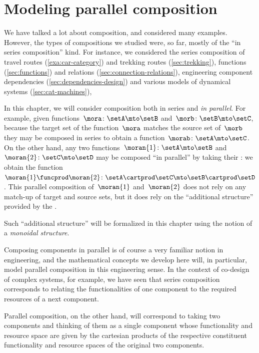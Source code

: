 
\section{Modeling parallel composition}
\label{sec:modeling-parallelism}

We have talked a lot about composition, and considered many examples.
However, the types of compositions we studied were, so far, mostly of the ``in series composition'' kind.
For instance, we considered the series composition of travel routes (\cref{exa:car-category}) and trekking routes (\cref{sec:trekking}), functions (\cref{sec:functions}) and relations (\cref{sec:connection-relations}), engineering component dependencies (\cref{sec:dependencies-design}) and various models of dynamical systems  (\cref{sec:cat-machines}), \etc

In this chapter, we will consider composition both in series and \emph{in parallel}.
For example, given functions~$\mora\colon \setA \mto \setB$ and~$\morb\colon \setB \mto \setC$, because the target set of the function~$\mora$ matches the source set of~$\morb$ they may be composed in series to obtain a function~$\morab\colon \setA \mto \setC$.
On the other hand, any two functions~$\moran{1} \colon \setA \mto \setB$ and~$\moran{2} \colon \setC \mto \setD$ may be composed ``in parallel'' by taking their : we obtain the function~$\moran{1} \funcprod \moran{2}\colon \setA \cartprod \setC \mto \setB \cartprod \setD$.
This parallel composition of~$\moran{1}$ and~$\moran{2}$ does not rely on any match-up of target and source sets, but it does rely on the ``additional structure'' provided by the .

Such ``additional structure'' will be formalized in this chapter using the notion of a \emph{monoidal structure}.

Composing components in parallel is of course a very familiar notion in engineering, and the mathematical concepts we develop here will, in particular, model parallel composition in this engineering sense.
In the context of co-design of complex systems, for example, we have seen that series composition corresponds to relating the functionalities of one component to the required resources of a next component.


Parallel composition, on the other hand, will correspond to taking two components and thinking of them as a single component whose functionality and resource space are given by the cartesian products of the respective constituent functionality and resource spaces of the original two components.

